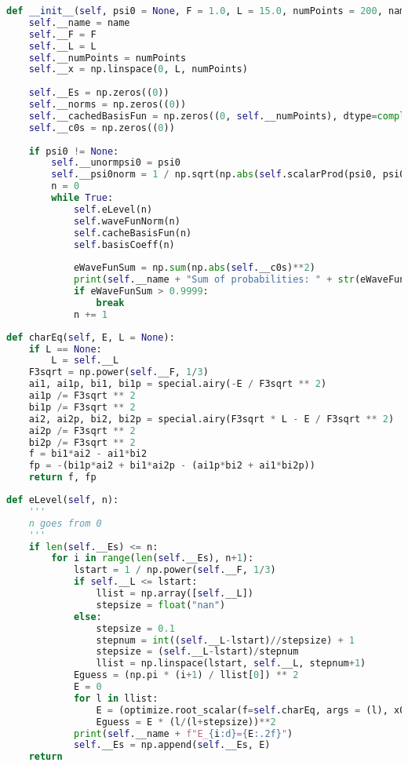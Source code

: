 
\begin{lstlisting}[language=Python]
def __init__(self, psi0 = None, F = 1.0, L = 15.0, numPoints = 200, name = "1D: "):
    self.__name = name
    self.__F = F
    self.__L = L
    self.__numPoints = numPoints
    self.__x = np.linspace(0, L, numPoints)
    
    self.__Es = np.zeros((0))
    self.__norms = np.zeros((0))
    self.__cachedBasisFun = np.zeros((0, self.__numPoints), dtype=complex)
    self.__c0s = np.zeros((0))
    
    if psi0 != None:
        self.__unormpsi0 = psi0
        self.__psi0norm = 1 / np.sqrt(np.abs(self.scalarProd(psi0, psi0)))
        n = 0
        while True:
            self.eLevel(n)
            self.waveFunNorm(n)
            self.cacheBasisFun(n)
            self.basisCoeff(n)
            
            eWaveFunSum = np.sum(np.abs(self.__c0s)**2)
            print(self.__name + "Sum of probabilities: " + str(eWaveFunSum))
            if eWaveFunSum > 0.9999:
                break
            n += 1
\end{lstlisting}

\begin{lstlisting}[language=Python]
def charEq(self, E, L = None):
    if L == None:
        L = self.__L
    F3sqrt = np.power(self.__F, 1/3)
    ai1, ai1p, bi1, bi1p = special.airy(-E / F3sqrt ** 2)
    ai1p /= F3sqrt ** 2
    bi1p /= F3sqrt ** 2
    ai2, ai2p, bi2, bi2p = special.airy(F3sqrt * L - E / F3sqrt ** 2)
    ai2p /= F3sqrt ** 2
    bi2p /= F3sqrt ** 2
    f = bi1*ai2 - ai1*bi2
    fp = -(bi1p*ai2 + bi1*ai2p - (ai1p*bi2 + ai1*bi2p))
    return f, fp
\end{lstlisting}

\begin{lstlisting}[language=Python]
def eLevel(self, n):
    '''
    n goes from 0
    '''
    if len(self.__Es) <= n:
        for i in range(len(self.__Es), n+1):
            lstart = 1 / np.power(self.__F, 1/3)
            if self.__L <= lstart:
                llist = np.array([self.__L])
                stepsize = float("nan")
            else:
                stepsize = 0.1
                stepnum = int((self.__L-lstart)//stepsize) + 1
                stepsize = (self.__L-lstart)/stepnum
                llist = np.linspace(lstart, self.__L, stepnum+1)
            Eguess = (np.pi * (i+1) / llist[0]) ** 2
            E = 0
            for l in llist:
                E = (optimize.root_scalar(f=self.charEq, args = (l), x0=Eguess, fprime=True)).root
                Eguess = E * (l/(l+stepsize))**2
            print(self.__name + f"E_{i:d}={E:.2f}")
            self.__Es = np.append(self.__Es, E)
    return
\end{lstlisting}

